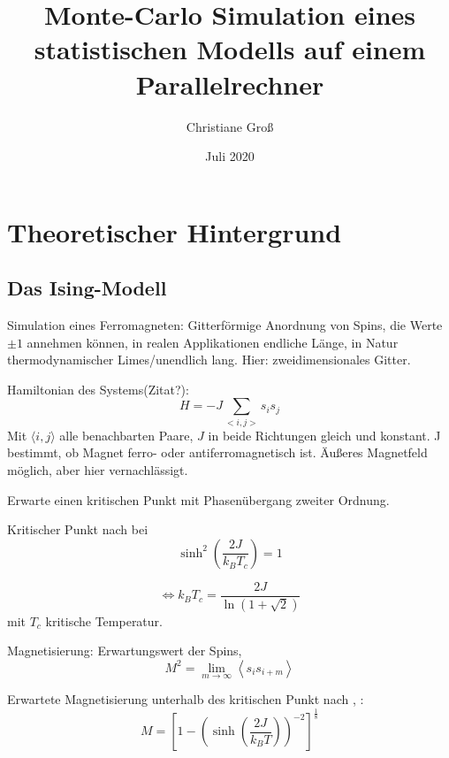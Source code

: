 \documentclass{scrreprt}
\title{Monte-Carlo Simulation eines statistischen Modells auf einem Parallelrechner}
\date{Juli 2020}
\author{Christiane Groß}
\begin{document}
	\maketitle
	
	
	\tableofcontents
	
	\clearpage
	
	\chapter{Theoretischer Hintergrund}
	
	\section{Das Ising-Modell}
	Simulation eines Ferromagneten: Gitterförmige Anordnung von Spins, die Werte $\pm1$ annehmen können, in realen Applikationen endliche Länge, in Natur thermodynamischer Limes/unendlich lang. Hier: zweidimensionales Gitter.
	
	Hamiltonian des Systems(Zitat?):
	\begin{equation}
	H=-J\sum_{<i,j>}s_is_j
	\label{eq:hamiltonianising}
	\end{equation}
	Mit $\langle i,j\rangle$ alle benachbarten Paare, $J$ in beide Richtungen gleich und konstant. J bestimmt, ob Magnet ferro- oder antiferromagnetisch ist. Äußeres Magnetfeld möglich, aber hier vernachlässigt.

	
	Erwarte einen kritischen Punkt mit Phasenübergang zweiter Ordnung. \cite{OnsagerCrystal1}
	
	Kritischer Punkt nach \cite{OnsagerCrystal1} bei \[\sinh^2\left(\frac{2J}{k_BT_c}\right) =1\]
	
	\begin{equation}
	\Leftrightarrow k_BT_c=\frac{2J}{\ln(1+\sqrt{2})}
	\label{eq:kritischetemperatur}
	\end{equation}
	mit $T_c$ kritische Temperatur.
	
	Magnetisierung: Erwartungswert der Spins, \[
	M^2=\lim\limits_{m\to\infty}\left\langle s_i s_{i+m}\right\rangle \]
	
	Erwartete Magnetisierung unterhalb des kritischen Punkt nach \cite{YangMagnetization}, \cite{MontrollMagnetization}:
	\[ M=\left[1-\left(\sinh\left(\frac{2J}{k_BT}\right)\right)^{-2}\right]^{\frac{1}{8}}\]
	
\end{document}
